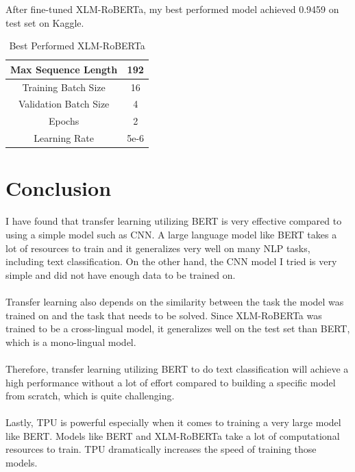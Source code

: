 \documentclass[11pt,a4paper]{article}
\begin{document}
\noindent After fine-tuned XLM-RoBERTa, my best performed model achieved 0.9459 on test set on Kaggle.

\begin{table}[!htbp]
	\centering
	\begin{tabular}{|c|c|}
		\hline
		{Max Sequence Length}   & 192  \\ \hline
		{Training Batch Size}   & 16   \\ \hline
		{Validation Batch Size} & 4    \\ \hline
		{Epochs}                & 2    \\ \hline
		{Learning Rate}         & 5e-6 \\ \hline
	\end{tabular}
	\caption{\label{table:my-label} Best Performed XLM-RoBERTa}
\end{table}


\section{Conclusion}

I have found that transfer learning utilizing BERT is very effective compared to using a simple model such as CNN. A large language model like BERT takes a lot of resources to train and it generalizes very well on many NLP tasks, including text classification. On the other hand, the CNN model I tried is very simple and did not have enough data to be trained on.\\
\\
Transfer learning also depends on the similarity between the task the model was trained on and the task that needs to be solved. Since XLM-RoBERTa was trained to be a cross-lingual model, it generalizes well on the test set than BERT, which is a mono-lingual model.\\
\\
Therefore, transfer learning utilizing BERT to do text classification will achieve a high performance without a lot of effort compared to building a specific model from scratch, which is quite challenging.\\
\\
Lastly, TPU is powerful especially when it comes to training a very large model like BERT. Models like BERT and XLM-RoBERTa take a lot of computational resources to train. TPU dramatically increases the speed of training those models.\\

\newpage
\

\end{document}
